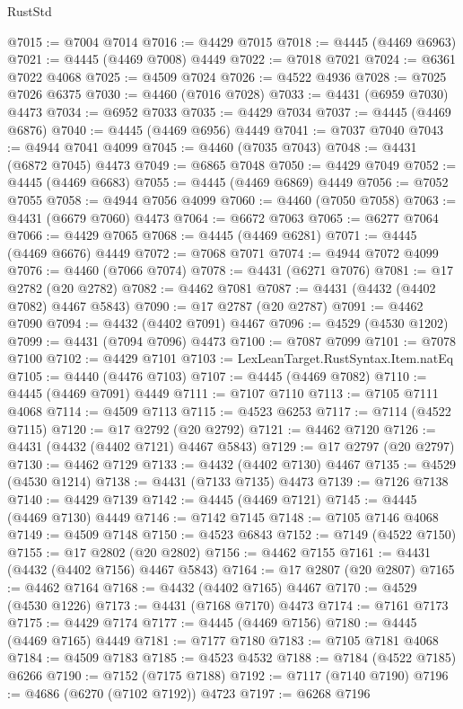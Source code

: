 \begin{lexlean}{RustStd}
\begin{coremodule}
@7015 := @7004 @7014
@7016 := @4429 @7015
@7018 := @4445 (@4469 @6963)
@7021 := @4445 (@4469 @7008) @4449
@7022 := @7018 @7021
@7024 := @6361 @7022 @4068
@7025 := @4509 @7024
@7026 := @4522 @4936
@7028 := @7025 @7026 @6375
@7030 := @4460 (@7016 @7028)
@7033 := @4431 (@6959 @7030) @4473
@7034 := @6952 @7033
@7035 := @4429 @7034
@7037 := @4445 (@4469 @6876)
@7040 := @4445 (@4469 @6956) @4449
@7041 := @7037 @7040
@7043 := @4944 @7041 @4099
@7045 := @4460 (@7035 @7043)
@7048 := @4431 (@6872 @7045) @4473
@7049 := @6865 @7048
@7050 := @4429 @7049
@7052 := @4445 (@4469 @6683)
@7055 := @4445 (@4469 @6869) @4449
@7056 := @7052 @7055
@7058 := @4944 @7056 @4099
@7060 := @4460 (@7050 @7058)
@7063 := @4431 (@6679 @7060) @4473
@7064 := @6672 @7063
@7065 := @6277 @7064
@7066 := @4429 @7065
@7068 := @4445 (@4469 @6281)
@7071 := @4445 (@4469 @6676) @4449
@7072 := @7068 @7071
@7074 := @4944 @7072 @4099
@7076 := @4460 (@7066 @7074)
@7078 := @4431 (@6271 @7076)
@7081 := @17 @2782 (@20 @2782)
@7082 := @4462 @7081
@7087 := @4431 (@4432 (@4402 @7082) @4467 @5843)
@7090 := @17 @2787 (@20 @2787)
@7091 := @4462 @7090
@7094 := @4432 (@4402 @7091) @4467
@7096 := @4529 (@4530 @1202)
@7099 := @4431 (@7094 @7096) @4473
@7100 := @7087 @7099
@7101 := @7078 @7100
@7102 := @4429 @7101
@7103 := LexLeanTarget.RustSyntax.Item.natEq
@7105 := @4440 (@4476 @7103)
@7107 := @4445 (@4469 @7082)
@7110 := @4445 (@4469 @7091) @4449
@7111 := @7107 @7110
@7113 := @7105 @7111 @4068
@7114 := @4509 @7113
@7115 := @4523 @6253
@7117 := @7114 (@4522 @7115)
@7120 := @17 @2792 (@20 @2792)
@7121 := @4462 @7120
@7126 := @4431 (@4432 (@4402 @7121) @4467 @5843)
@7129 := @17 @2797 (@20 @2797)
@7130 := @4462 @7129
@7133 := @4432 (@4402 @7130) @4467
@7135 := @4529 (@4530 @1214)
@7138 := @4431 (@7133 @7135) @4473
@7139 := @7126 @7138
@7140 := @4429 @7139
@7142 := @4445 (@4469 @7121)
@7145 := @4445 (@4469 @7130) @4449
@7146 := @7142 @7145
@7148 := @7105 @7146 @4068
@7149 := @4509 @7148
@7150 := @4523 @6843
@7152 := @7149 (@4522 @7150)
@7155 := @17 @2802 (@20 @2802)
@7156 := @4462 @7155
@7161 := @4431 (@4432 (@4402 @7156) @4467 @5843)
@7164 := @17 @2807 (@20 @2807)
@7165 := @4462 @7164
@7168 := @4432 (@4402 @7165) @4467
@7170 := @4529 (@4530 @1226)
@7173 := @4431 (@7168 @7170) @4473
@7174 := @7161 @7173
@7175 := @4429 @7174
@7177 := @4445 (@4469 @7156)
@7180 := @4445 (@4469 @7165) @4449
@7181 := @7177 @7180
@7183 := @7105 @7181 @4068
@7184 := @4509 @7183
@7185 := @4523 @4532
@7188 := @7184 (@4522 @7185) @6266
@7190 := @7152 (@7175 @7188)
@7192 := @7117 (@7140 @7190)
@7196 := @4686 (@6270 (@7102 @7192)) @4723
@7197 := @6268 @7196

\end{coremodule}
\end{lexlean}

